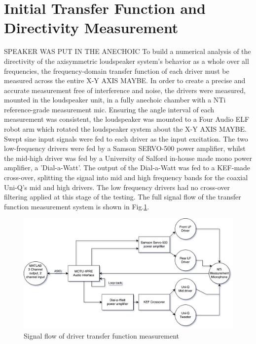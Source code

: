 \documentclass{report}
\begin{document}
    \section{Initial Transfer Function and Directivity Measurement}
        SPEAKER WAS PUT IN THE ANECHOIC
        To build a numerical analysis of the directivity of the axisymmetric loudspeaker system's behavior as a whole over all frequencies, the frequency-domain transfer function of each driver must be measured across the entire X-Y AXIS MAYBE.
        In order to create a precise and accurate measurement free of interference and noise, the drivers were measured, mounted in the loudspeaker unit, in a fully anechoic chamber with a NTi reference-grade measurement mic.
        Ensuring the angle interval of each measurement was consistent, the loudspeaker was mounted to a Four Audio ELF robot arm which rotated the loudspeaker system about the X-Y AXIS MAYBE.
        Swept sine input signals were fed to each driver as the input excitation.
        The two low-frequency drivers were fed by a Samson SERVO-500 power amplifier, whilst the mid-high driver was fed by a University of Salford in-house made mono power amplifier, a 'Dial-a-Watt'.
        The output of the Dial-a-Watt was fed to a KEF-made cross-over, splitting the signal into mid and high frequency bands for the coaxial Uni-Q's mid and high drivers.
        The low frequency drivers had no cross-over filtering applied at this stage of the testing.
        The full signal flow of the transfer function measurement system is shown in Fig.\ref{signalFlow}.
        \begin{figure}[H]
            \centering
            \includegraphics[scale=0.04]{figs/signalFlow.png}%
            \caption{Signal flow of driver transfer function measurement}
            \label{signalFlow}
        \end{figure}
\end{document}
